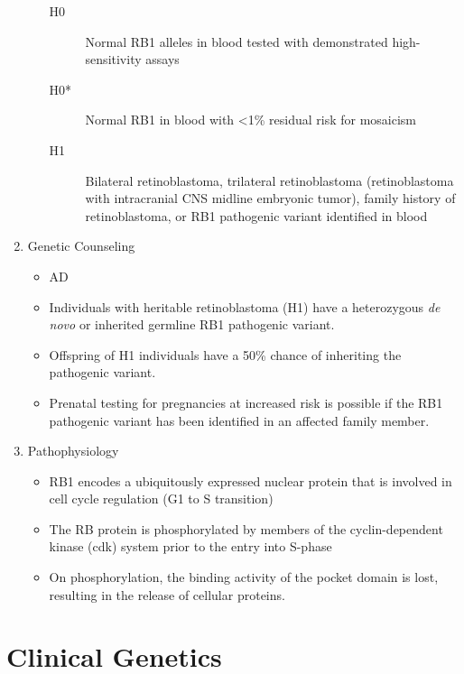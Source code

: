 \documentclass[12pt]{scrartcl}
\begin{document}
\begin{enumerate}
\begin{itemize}
\begin{description}
\item[{H0}] Normal RB1 alleles in blood tested with demonstrated
high-sensitivity assays

\item[{H0*}] Normal RB1 in blood with <1\% residual risk for mosaicism

\item[{H1}] Bilateral retinoblastoma, trilateral retinoblastoma
(retinoblastoma with intracranial CNS midline embryonic
tumor), family history of retinoblastoma, or RB1 pathogenic
variant identified in blood
\end{description}
\end{itemize}

\item Genetic Counseling
\label{sec:org67af52e}
\begin{itemize}
\item AD
\item Individuals with heritable retinoblastoma (H1) have a heterozygous
\emph{de novo} or inherited germline RB1 pathogenic variant.
\item Offspring of H1 individuals have a 50\% chance of inheriting the
pathogenic variant.
\item Prenatal testing for pregnancies at increased risk is possible if
the RB1 pathogenic variant has been identified in an affected family
member.
\end{itemize}

\item Pathophysiology
\label{sec:org393109b}
\begin{itemize}
\item RB1 encodes a ubiquitously expressed nuclear protein that is
involved in cell cycle regulation (G1 to S transition)
\item The RB protein is phosphorylated by members of the cyclin-dependent kinase
(cdk) system prior to the entry into S-phase
\item On phosphorylation, the binding activity of the pocket domain is
lost, resulting in the release of cellular proteins.
\end{itemize}
\end{enumerate}

\section{Clinical Genetics}
\label{sec:org1869a4e}
\end{document}
